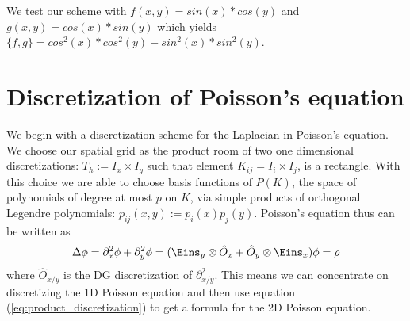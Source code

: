 \documentclass[a4paper,12pt]{scrartcl}
\begin{document}
We test our scheme with $f(x,y) = sin(x)*cos(y)$ and 
$g(x,y) = cos(x)*sin(y)$ which yields 
$\{f,g\} = cos^2(x)*cos^2(y) - sin^2(x)*sin^2(y)$. 












\section{ Discretization of Poisson's equation}
We begin with a discretization scheme for the Laplacian in Poisson's equation.
We choose our spatial grid as the product room of two one dimensional
discretizations: $T_h := I_x \times I_y$ such that element $K_{ij} = I_i \times I_j$,
is a rectangle. With this choice we are able to choose basis functions 
of $P(K)$, the space of polynomials of degree at most $p$ on $K$, 
via simple products of orthogonal Legendre polynomials: 
$p_{ij}(x,y) := p_i(x) p_j(y)$. Poisson's equation thus can be written as
\begin{align}
    \Delta \phi = \partial_x^2 \phi + \partial_y^2 \phi = (\Eins_y \otimes \hat O_x + \hat O_y \otimes \Eins_x) \phi = \rho
    \label{eq:product_discretization}
\end{align}
where $\hat O_{x/y}$ is the DG discretization of $\partial_{x/y}^2$. This means we 
can concentrate on discretizing the 1D Poisson equation and then use
equation (\ref{eq:product_discretization}) to get a formula for the 2D Poisson 
equation.
\end{document}
